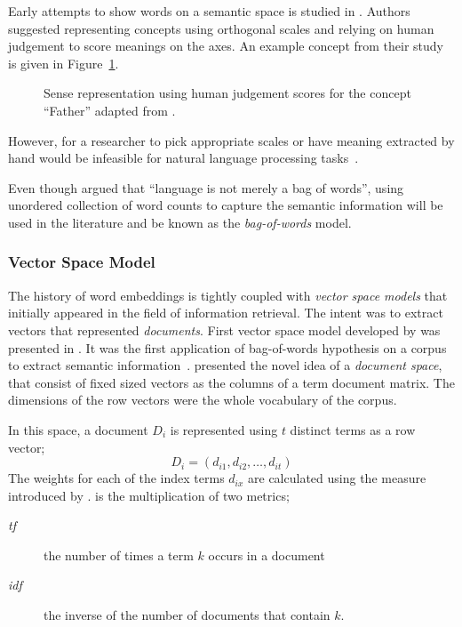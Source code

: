 Early attempts to show words on a semantic space is studied in \textcite{osgood_measurement_1957}.
Authors suggested representing concepts using orthogonal scales and relying on human judgement to score meanings on the axes.
An example concept from their study is given in Figure~\ref{fig:early_vectors}.
\begin{figure}[htbp]
    \centering
    \caption{Sense representation using human judgement scores for the concept \enquote{Father} adapted from \textcite{osgood_measurement_1957}.}%
    \label{fig:early_vectors}
\end{figure}
However, for a researcher to pick appropriate scales or have meaning extracted by hand would be infeasible for natural language processing tasks~\cite{lund_producing_1996}.

Even though \citeauthor{harris_distributional_1954} argued that \enquote{language is not merely a bag of words}, using unordered collection of word counts to capture the semantic information will be used in the literature and be known as the \emph{bag-of-words} model.

\subsubsection{Vector Space Model}%
\label{ssub:vector_space_model}

The history of word embeddings is tightly coupled with \emph{vector space models} that initially appeared in the field of information retrieval.
The intent was to extract vectors that represented \emph{documents}.
First vector space model developed by \textcite{salton_vector_1975} was presented in .
It was the first application of bag-of-words hypothesis on a corpus to extract semantic information~\cite{turney_frequency_2010}.
\citeauthor{salton_vector_1975} presented the novel idea of a \emph{document space}, that consist of fixed sized vectors as the columns of a term document matrix.
The dimensions of the row vectors were the whole vocabulary of the corpus.

In this space, a document $D_i$ is represented using $t$ distinct terms as a row vector;
\begin{displaymath}
    D_{i} = (d_{i1}, d_{i2}, \ldots, d_{it})
\end{displaymath}
The weights for each of the index terms $d_{ix}$ are calculated using the \tfidf{} measure introduced by \textcite{jones_statistical_1972}.
\tfidf{} is the multiplication of two metrics;
\begin{description}
    \item[\emph{tf}] the number of times a term $k$ occurs in a document
    \item[\emph{idf}] the inverse of the number of documents that contain $k$.
\end{description}

